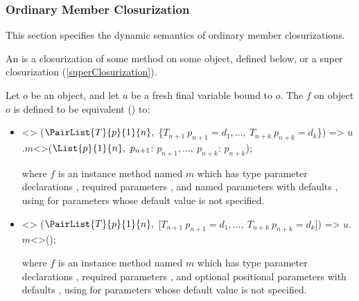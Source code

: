 \documentclass[makeidx]{article}
\begin{document}


\subsubsection{Ordinary Member Closurization}

\LMHash{}%
This section specifies the dynamic semantics of
ordinary member closurizations.


\LMHash{}%
An 
is a closurization of some method on some object, defined below,
or a super closurization (\ref{superClosurization}).

\LMHash{}%
Let $o$ be an object, and let $u$ be a fresh final variable bound to $o$.
The  $f$ on object $o$
is defined to be equivalent
() to:
\begin{itemize}
\item
\begin{normativeDartCode}
<>
($\PairList{T}{p}{1}{n},\ $\{$T_{n+1}\ p_{n+1} = d_1, \ldots,\ T_{n+k}\ p_{n+k} = d_k$\}) =>
\quad$u$.$m$<>($\List{p}{1}{n},\ p_{n+1}$: $p_{n+1}, \ldots,\ p_{n+k}$: $p_{n+k}$);
\end{normativeDartCode}
where $f$ is an instance method named $m$
which has type parameter declarations
\TypeParametersStd{},
required parameters ,
and named parameters  with defaults ,
using  for parameters whose default value is not specified.
\item
\begin{normativeDartCode}
<>
($\PairList{T}{p}{1}{n},\ $[$T_{n+1}\ p_{n+1} = d_1, \ldots,\ T_{n+k}\ p_{n+k} = d_k$]) =>
\quad$u$.$m$<>();
\end{normativeDartCode}
where $f$ is an instance method named $m$
which has type parameter declarations
\TypeParametersStd{},
required parameters ,
and optional positional parameters
 with defaults ,
using  for parameters whose default value is not specified.
\end{itemize}
\end{document}
